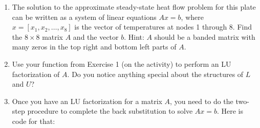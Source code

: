 \documentclass[]{article}
\begin{document}
\begin{enumerate}
\def\labelenumi{\alph{enumi})}
\item
  The solution to the approximate steady-state heat flow problem for
  this plate can be written as a system of linear equations \(Ax=b\),
  where \(x=[x_1, x_2, \ldots, x_8]\) is the vector of temperatures at
  nodes 1 through 8. Find the \(8 \times 8\) matrix \(A\) and the vector
  \(b\). Hint: \(A\) should be a banded matrix with many zeros in the
  top right and bottom left parts of \(A\).
\item
  Use your function from Exercise 1 (on the activity) to perform an LU
  factorization of \(A\). Do you notice anything special about the
  structures of \(L\) and \(U\)?
\item
  Once you have an LU factorization for a matrix \(A\), you need to do
  the two-step procedure to complete the back substitution to solve
  \(Ax=b\). Here is code for that:
\end{enumerate}
\end{document}
